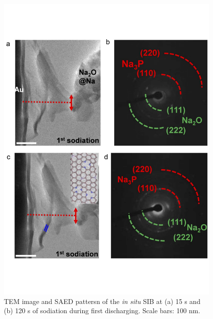 \begin{figure}  
\centering
\includegraphics[width=320pt,angle=0]{figures/figure4_3cd}
\caption[{\it In situ} sodiation process of P@GN SIB]
{
 TEM image and SAED pattersn of the {\em in situ} SIB at (a) 15 s and (b) 120 s of sodiation during first discharging. Scale bars: 100 nm.
\label{fig:4_3cd}}
\end{figure}


